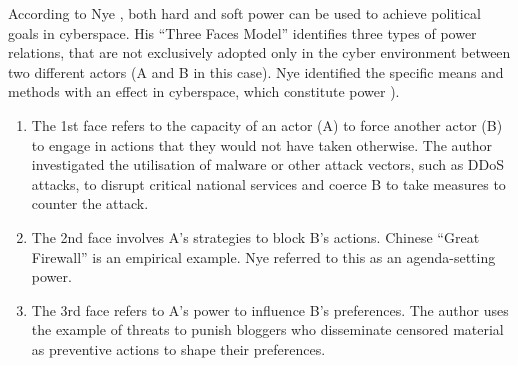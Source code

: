 According to Nye  \textcite{nye_2010_cyber}, both hard and soft power can be used to achieve political goals in cyberspace. His “Three Faces Model” identifies three types of power relations, that are not exclusively adopted only in the cyber environment between two different actors (A and B in this case). Nye identified the specific means and methods with an effect in cyberspace, which constitute power \autocite{vanhaaster_2016_assessing}). 

\begin{enumerate}

   \item The 1st face refers to the capacity of an actor (A) to force another actor (B) to engage in actions that they would not have taken otherwise. The author investigated the utilisation of malware or other attack vectors, such as DDoS attacks, to disrupt critical national services and coerce B to take measures to counter the attack. 
   \item The 2nd face involves A’s strategies to block B’s actions. Chinese “Great Firewall” is an empirical example. Nye referred to this as an agenda-setting power.
   \item The 3rd face refers to A’s power to influence B’s preferences. The author uses the example of threats to punish bloggers who disseminate censored material as preventive actions to shape their preferences.
\end{enumerate}

